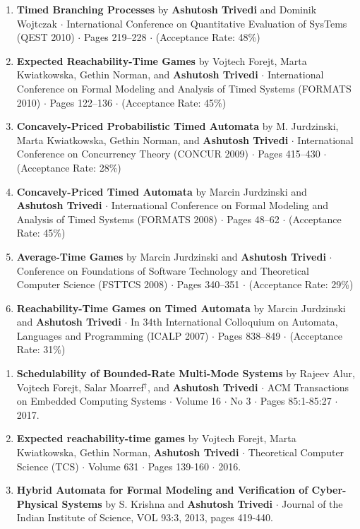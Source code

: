 \documentclass{article}
\begin{document}
\begin{enumerate}
\item
  {\bf Timed Branching Processes} by {\bf Ashutosh Trivedi} and Dominik Wojtczak $\cdot$
  International Conference on Quantitative
  Evaluation of SysTems (QEST 2010) $\cdot$ Pages 219--228
  $\cdot$ (Acceptance Rate: 48\%)
\item
  {\bf Expected Reachability-Time Games} by Vojtech Forejt, Marta Kwiatkowska,
  Gethin Norman, and {\bf Ashutosh Trivedi} $\cdot$ 
  International Conference on Formal Modeling and Analysis of Timed Systems
  (FORMATS 2010) $\cdot$ Pages 122--136
  $\cdot$ (Acceptance Rate: 45\%)
\item 
  {\bf Concavely-Priced Probabilistic Timed Automata} by M. Jurdzinski,
  Marta Kwiatkowska, Gethin Norman, and {\bf Ashutosh Trivedi} $\cdot$ 
 International Conference on Concurrency Theory (CONCUR 2009) $\cdot$ Pages 415--430
 $\cdot$ (Acceptance Rate: 28\%)
\item
  {\bf Concavely-Priced Timed Automata} by Marcin Jurdzinski and {\bf Ashutosh Trivedi}
  $\cdot$ International Conference on Formal 
  Modeling and Analysis of Timed Systems (FORMATS 2008) $\cdot$ Pages 48--62
  $\cdot$ (Acceptance Rate: 45\%)
\item
  {\bf Average-Time Games} by Marcin Jurdzinski and {\bf Ashutosh Trivedi} $\cdot$ Conference on Foundations of Software Technology and Theoretical
  Computer Science (FSTTCS 2008) $\cdot$ Pages 340--351
  $\cdot$ (Acceptance Rate: 29\%)

\item
  {\bf Reachability-Time Games on Timed Automata} by Marcin Jurdzinski and {\bf
  Ashutosh Trivedi} $\cdot$ In 34th International Colloquium on Automata,
  Languages and Programming (ICALP 2007) $\cdot$ Pages 838--849
  $\cdot$ (Acceptance Rate: 31\%)
\end{enumerate}

\vspace{1em}
\begin{enumerate}
  \item
  {\bf Schedulability of Bounded-Rate Multi-Mode Systems} by
  Rajeev Alur, Vojtech Forejt, Salar Moarref${}^{\dag}$, and {\bf Ashutosh Trivedi} $\cdot$ 
  ACM Transactions on Embedded Computing Systems $\cdot$ Volume 16 $\cdot$ No 3 $\cdot$ Pages 85:1-85:27
  $\cdot$ 2017.
  \item
  {\bf Expected reachability-time games} by
  Vojtech Forejt, Marta Kwiatkowska, Gethin Norman, {\bf Ashutosh Trivedi} $\cdot$
  Theoretical Computer Science (TCS) $\cdot$ Volume 631 $\cdot$ Pages 139-160
  $\cdot$  2016.
  \item 
  {\bf Hybrid Automata for Formal Modeling and Verification of
   Cyber-Physical Systems} by S. Krishna and {\bf Ashutosh Trivedi} $\cdot$
 Journal of the Indian Institute of Science, VOL 93:3, 2013, pages 419-440. 
\end{enumerate}
\end{document}
